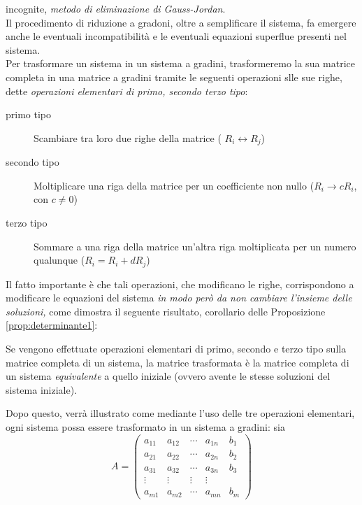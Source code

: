 incognite, \textit{metodo di eliminazione di Gauss-Jordan}.\\
Il procedimento di riduzione a gradoni, oltre a semplificare il sistema, fa
emergere anche le eventuali incompatibilità e le eventuali equazioni
superflue presenti nel sistema.\\
Per trasformare un sistema in un sistema a gradini, trasformeremo la sua
matrice completa in una matrice a gradini tramite le seguenti operazioni
slle sue righe, dette \textit{operazioni elementari di primo, secondo
  terzo tipo}:
\begin{description}
\item[primo tipo] Scambiare tra loro due righe della matrice (
  $R_i \leftrightarrow R_j$)
\item[secondo tipo] Moltiplicare una riga della matrice per un
  coefficiente non nullo ($R_i\to cR_i$, con $c\neq 0$)
\item[terzo tipo] Sommare a una riga della matrice un'altra riga
  moltiplicata per un numero qualunque ($R_i=R_i+dR_j$)
\end{description}
Il fatto importante è che tali operazioni, che modificano le righe,
corrispondono a modificare le equazioni del sistema \textit{in modo però
  da non cambiare l'insieme delle soluzioni,} come dimostra il seguente
risultato, corollario delle Proposizione \ref{prop:determinante1}:
\begin{prop}
  \label{prop:determinante2}
  Se vengono effettuate operazioni elementari di primo, secondo e terzo
  tipo sulla matrice completa di un sistema, la matrice trasformata è la
  matrice completa di un sistema \textit{equivalente} a quello iniziale
  (ovvero avente le stesse soluzioni del sistema iniziale).
\end{prop}
Dopo questo, verrà illustrato come mediante l'uso delle tre operazioni
elementari, ogni sistema possa essere trasformato in un sistema a gradini:
sia
\begin{equation}
  \label{eq:gauss-jorda4}
  A=
  \begin{pmatrix}
    a_{11} & a_{12} & \cdots & a_{1n} & b_1\\
    a_{21} & a_{22} & \cdots & a_{2n} & b_2\\
    a_{31} & a_{32} & \cdots & a_{3n} & b_3\\
    \vdots & \vdots & \vdots & \vdots\\
    a_{m1} & a_{m2} & \cdots & a_{mn} & b_m
  \end{pmatrix}
\end{equation}
